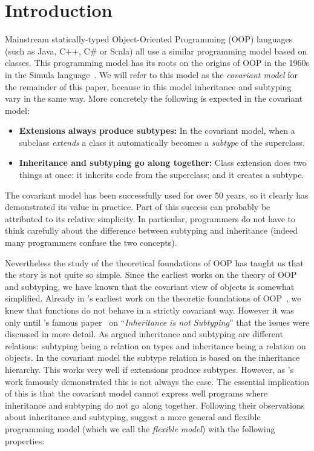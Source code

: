 \section{Introduction}
\label{sec:intro}

Mainstream statically-typed Object-Oriented Programming (OOP) languages (such as Java,
C++, C\# or Scala) all use a similar programming model based on
classes. This programming model has its roots on the
origins of OOP in the 1960s in the Simula language~\citep{dahl1967simula}.
We will refer to this model as the \emph{covariant model} for the
remainder of this paper, because in this model inheritance and
subtyping vary in the same way. More concretely
the following is expected in the covariant model:

\begin{itemize}

\item {\bf Extensions always produce subtypes:} In the covariant model, when a 
subclass \emph{extends} a class it automatically becomes a 
\emph{subtype} of the superclass.

\item{\bf Inheritance and subtyping go along together:}
Class extension does two things at once: it inherits code from the
superclass; and it creates a subtype. 

\end{itemize}

The covariant model has been successfully used for over 50 years,
so it clearly has demonstrated its value in practice. 
Part of this success can probably be attributed 
to its relative simplicity. In particular, programmers do not have to think carefully 
about the difference between subtyping and inheritance (indeed many
programmers confuse the two concepts). 

Nevertheless the study of the theoretical foundations of OOP has taught us that
the story is not quite so simple. Since the earliest works on the theory of OOP
and subtyping, we have known that the covariant view of objects is somewhat
simplified. Already in \citeauthor{cardelli1984semantics}'s earliest work on
the theoretic foundations of OOP~\citep{cardelli1984semantics}, we knew that functions do not behave in a
strictly covariant way. However it was only until \citeauthor{cook1989inheritance}'s
famous paper~\citeyear{cook1989inheritance} on ``\emph{Inheritance is not Subtyping}'' that the issues were
discussed in more detail. As \citeauthor{cook1989inheritance} argued inheritance and subtyping are
different relations: subtyping being a relation on types and inheritance being a
relation on objects. In the covariant model the subtype relation is based on the
inheritance hierarchy. This works very well if extensions produce subtypes.
However, as \citeauthor{cook1989inheritance}'s work famously demonstrated this is not always the
case. The essential implication of this is that the covariant model cannot
express well programs where inheritance and subtyping do not go along together.
Following their observations about inheritance and subtyping, \citeauthor{cook1989inheritance}
suggest a more general and flexible programming model (which we call the
\emph{flexible model}) with the following properties:

